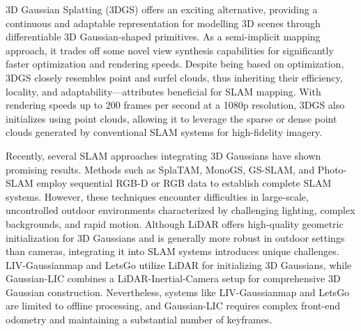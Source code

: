 \documentclass[lettersize,journal]{IEEEtran}
\begin{document}
3D Gaussian Splatting (3DGS) offers an exciting alternative, providing a continuous and adaptable representation for modelling 3D scenes through differentiable 3D Gaussian-shaped primitives\cite{fei20243d}\cite{kerbl20233d}. As a semi-implicit mapping approach, it trades off some novel view synthesis capabilities for significantly faster optimization and rendering speeds. Despite being based on optimization, 3DGS closely resembles point and surfel clouds, thus inheriting their efficiency, locality, and adaptability—attributes beneficial for SLAM mapping. With rendering speeds up to 200 frames per second at a 1080p resolution, 3DGS also initializes using point clouds, allowing it to leverage the sparse or dense point clouds generated by conventional SLAM systems for high-fidelity imagery\cite{monogs}.

Recently, several SLAM approaches integrating 3D Gaussians have shown promising results. Methods such as SplaTAM\cite{splatam}, MonoGS\cite{monogs}, GS-SLAM\cite{gsslam}, and Photo-SLAM\cite{photoslam} employ sequential RGB-D or RGB data to establish complete SLAM systems. However, these techniques encounter difficulties in large-scale, uncontrolled outdoor environments characterized by challenging lighting, complex backgrounds, and rapid motion. Although LiDAR offers high-quality geometric initialization for 3D Gaussians and is generally more robust in outdoor settings than cameras, integrating it into SLAM systems introduces unique challenges. LIV-Gaussianmap\cite{livgaussmap} and LetsGo\cite{letsgo} utilize LiDAR for initializing 3D Gaussians, while Gaussian-LIC\cite{gaussianlic} combines a LiDAR-Inertial-Camera setup for comprehensive 3D Gaussian construction. Nevertheless, systems like LIV-Gaussianmap\cite{livgaussmap} and LetsGo\cite{letsgo} are limited to offline processing, and Gaussian-LIC\cite{gaussianlic} requires complex front-end odometry and maintaining a substantial number of keyframes.
\end{document}
